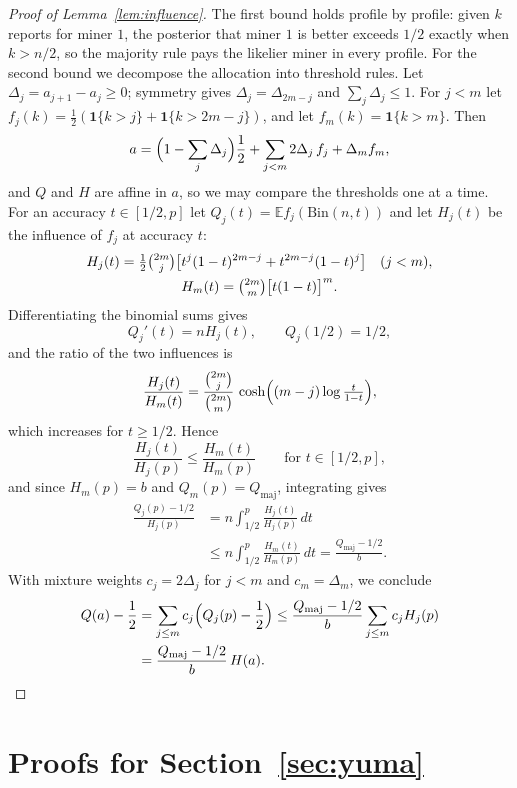 \documentclass[sigconf,anonymous,review]{acmart}
\numberwithin{equation}{section}
\newcommand{\E}{\mathbb{E}}
\newcommand{\Qmaj}{Q_{\mathrm{maj}}}
\newcommand{\Bin}{\mathrm{Bin}}
\newcommand{\one}{\mathbf{1}}
\begin{document}
\begin{proof}[Proof of Lemma~\ref{lem:influence}]
The first bound holds profile by profile: given $k$ reports for miner $1$, the
posterior that miner $1$ is better exceeds $1/2$ exactly when $k>n/2$, so the
majority rule pays the likelier miner in every profile. For the second bound
we decompose the allocation into threshold rules. Let
$\Delta_j=a_{j+1}-a_j\ge0$; symmetry gives $\Delta_j=\Delta_{2m-j}$ and
$\sum_j\Delta_j\le1$. For $j<m$ let
$f_j(k)=\frac12(\one\{k>j\}+\one\{k>2m-j\})$, and let $f_m(k)=\one\{k>m\}$.
Then
\[
a=\Bigl(1-\sum_j\Delta_j\Bigr)\frac12+\sum_{j<m}2\Delta_j\,f_j+\Delta_m f_m ,
\]
and $Q$ and $H$ are affine in $a$, so we may compare the thresholds one at a
time. For an accuracy $t\in[1/2,p]$ let $Q_j(t)=\E f_j(\Bin(n,t))$ and let
$H_j(t)$ be the influence of $f_j$ at accuracy $t$:
\begin{gather*}
H_j(t)=\tfrac12\tbinom{2m}{j}\bigl[t^j(1-t)^{2m-j}+t^{2m-j}(1-t)^j\bigr]\quad(j<m),\\
H_m(t)=\tbinom{2m}{m}\bigl[t(1-t)\bigr]^m .
\end{gather*}
Differentiating the binomial sums gives
\[
Q_j'(t)=nH_j(t),\qquad Q_j(1/2)=1/2,
\]
and the ratio of the two influences is
\[
\frac{H_j(t)}{H_m(t)}=\frac{\tbinom{2m}{j}}{\tbinom{2m}{m}}\,\cosh\Bigl((m-j)\log\tfrac{t}{1-t}\Bigr),
\]
which increases for $t\ge1/2$. Hence
\[
\frac{H_j(t)}{H_j(p)}\le\frac{H_m(t)}{H_m(p)}\qquad\text{for }t\in[1/2,p],
\]
and since $H_m(p)=b$ and $Q_m(p)=\Qmaj$, integrating gives
\begin{align*}
\frac{Q_j(p)-1/2}{H_j(p)}&=n\int_{1/2}^{p}\frac{H_j(t)}{H_j(p)}\,dt\\
&\le n\int_{1/2}^{p}\frac{H_m(t)}{H_m(p)}\,dt=\frac{\Qmaj-1/2}{b}.
\end{align*}
With mixture weights $c_j=2\Delta_j$ for $j<m$ and $c_m=\Delta_m$, we conclude
\begin{align*}
Q(a)-\frac12&=\sum_{j\le m}c_j\Bigl(Q_j(p)-\frac12\Bigr)
\le\frac{\Qmaj-1/2}{b}\sum_{j\le m}c_jH_j(p)\\
&=\frac{\Qmaj-1/2}{b}\,H(a).\qedhere
\end{align*}
\end{proof}

\section{Proofs for Section~\ref{sec:yuma}}
\label{app:yuma}
\end{document}
